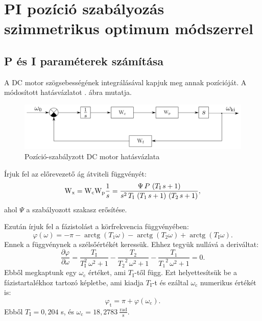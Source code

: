 \section{PI pozíció szabályozás szimmetrikus optimum módszerrel}

\subsection{P és I paraméterek számítása}

A DC motor szögsebességének integrálásával kapjuk meg annak pozícióját.
A módosított hatásvázlatot . ábra mutatja.

\begin{figure}[H]
	\centering
	\includegraphics[width=.7\textwidth]{pi-hatasvazlat-2}
	\caption{Pozíció-szabályzott DC motor hatásvázlata}
	\label{fig:pi-hatasvazlat-2}
\end{figure}

Írjuk fel az előrevezető ág átviteli függvényét:
\begin{equation}
	\mathrm{W}_\text{x} = \mathrm{W}_\text{c}\mathrm{W}_\text{p}\frac{1}{s} = 
	\frac{\Psi\, P\, \left(T_\text{I}\, s + 1\right)}{s^2\, T_\text{I}\, \left(T_1\, s + 1\right)\, \left(T_2\, s + 1\right)},
\end{equation}
ahol $\Psi$ a szabályozott szakasz erősítése.

Ezután írjuk fel a fázistolást a körfrekvencia függvényében:
\begin{equation}
	\varphi(\omega) = -\pi - \operatorname{arctg}(T_1\omega) - \operatorname{arctg}(T_2\omega) + \operatorname{arctg}(T_\text{I}\omega).
\end{equation}
Ennek a függvénynek a szélsőértékét keressük. Ehhez tegyük nullává a deriváltat:
\begin{equation}
	\frac{\partial\varphi}{\partial\omega} = 
	\frac{T_\text{I}}{T_\text{I}^2\, \omega^2 + 1} - \frac{T_2}{{T_2}^2\, \omega^2 + 1} - \frac{T_1}{{T_1}^2\, \omega^2 + 1} = 0.
\end{equation}
Ebből megkaptunk egy $\omega_\text{c}$ értéket, ami $T_\text{I}$-től függ.
Ezt helyettesítsük be a fázistartalékhoz tartozó képletbe, ami kiadja $T_\text{I}$-t és
ezáltal $\omega_\text{c}$ numerikus értékét is:
\begin{equation}
	\varphi_\text{t} = \pi + \varphi(\omega_\text{c}).
\end{equation}
Ebből $T_\text{I} = 0,204$ s, és $\omega_\text{c} = 18,2783~\frac{\text{rad}}{\text{s}}$.


